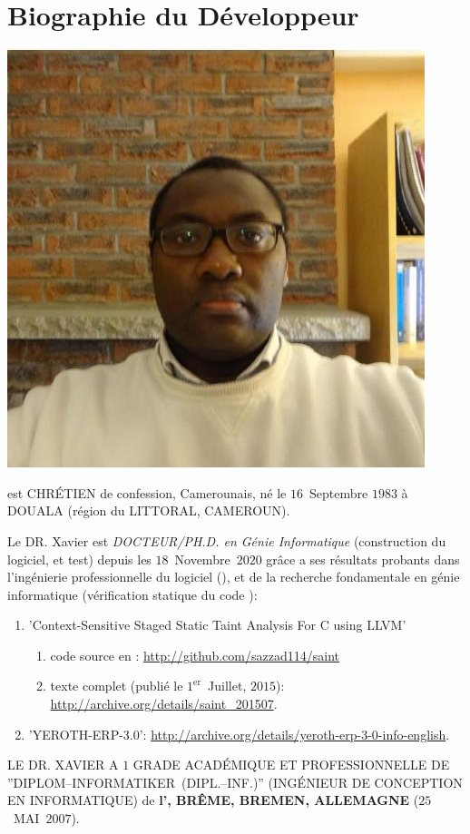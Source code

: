 \section{Biographie du D\'eveloppeur}\label{chap:biographie}
\vspace{-0.9em}

\begin{center}
\includegraphics[scale=0.32]{../../francais/images/XavierNOUNDOU-2}
\end{center}

\textbf{\myfullacademicname} est CHR\'ETIEN de confession,
Camerounais, n\'e le $16$~Septembre $1983$ \`a
DOUALA (r\'egion du LITTORAL, CAMEROUN).

Le DR. Xavier est \textit{DOCTEUR/PH.D. en G\'enie Informatique}
(construction du logiciel, et test) depuis les $18$~Novembre~$2020$
gr\^ace a ses r\'esultats probants dans l'ing\'enierie
professionnelle du logiciel (\yerotherpblack), et de la recherche
fondamentale en g\'enie informatique (v\'erification statique
du code \cplusplus):

\begin{enumerate}
	\item 'Context-Sensitive Staged Static Taint Analysis
			For C using LLVM'
		\begin{enumerate}[1.]
			\itemsep -0.7em
			\item code source en \cplusplus: \url{http://github.com/sazzad114/saint}
			\item texte complet (publi\'e le $1^\text{er}$~Juillet, $2015$): \url{http://archive.org/details/saint_201507}.
		\end{enumerate}		 

	\item 'YEROTH-ERP-3.0': \url{http://archive.org/details/yeroth-erp-3-0-info-english}.\\
\end{enumerate}


LE DR. XAVIER A $1$ GRADE ACAD\'EMIQUE ET PROFESSIONNELLE
DE ''DIPLOM--INFORMATIKER~(DIPL.--INF.)''
(ING\'ENIEUR DE CONCEPTION EN INFORMATIQUE) de
\textbf{l'\bremenu, BR\^EME, BREMEN, ALLEMAGNE}
($25$~MAI~$2007$).

